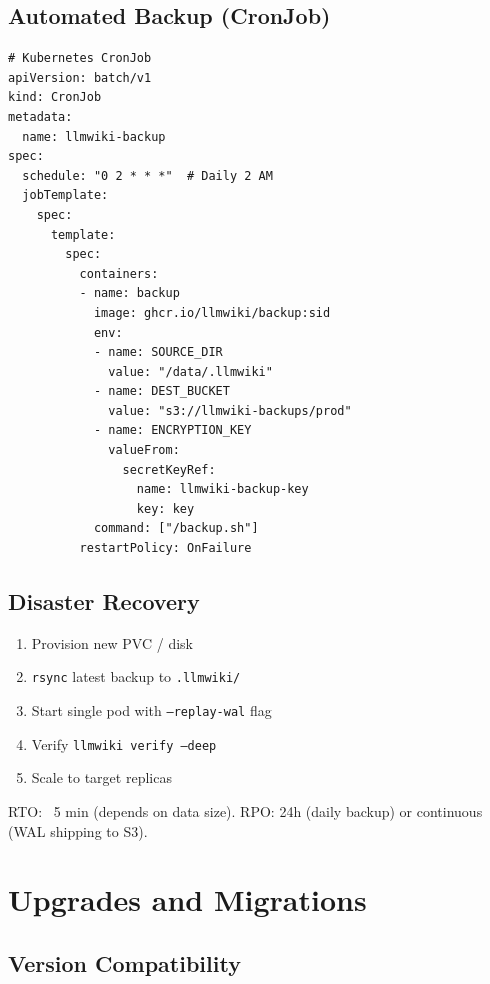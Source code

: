\subsection{Automated Backup (CronJob)}
\label{sec:deploy:backup-cron}

\begin{verbatim}
# Kubernetes CronJob
apiVersion: batch/v1
kind: CronJob
metadata:
  name: llmwiki-backup
spec:
  schedule: "0 2 * * *"  # Daily 2 AM
  jobTemplate:
    spec:
      template:
        spec:
          containers:
          - name: backup
            image: ghcr.io/llmwiki/backup:sid
            env:
            - name: SOURCE_DIR
              value: "/data/.llmwiki"
            - name: DEST_BUCKET
              value: "s3://llmwiki-backups/prod"
            - name: ENCRYPTION_KEY
              valueFrom:
                secretKeyRef:
                  name: llmwiki-backup-key
                  key: key
            command: ["/backup.sh"]
          restartPolicy: OnFailure
\end{verbatim}

\subsection{Disaster Recovery}
\label{sec:deploy:dr}

\begin{enumerate}
  \item Provision new PVC / disk
  \item \texttt{rsync} latest backup to \texttt{.llmwiki/}
  \item Start single pod with \texttt{--replay-wal} flag
  \item Verify \texttt{llmwiki verify --deep}
  \item Scale to target replicas
\end{enumerate}

RTO: ~5 min (depends on data size). RPO: 24h (daily backup) or continuous (WAL shipping to S3).

\section{Upgrades and Migrations}
\label{sec:deploy:upgrades}

\subsection{Version Compatibility}
\label{sec:deploy:compat}

